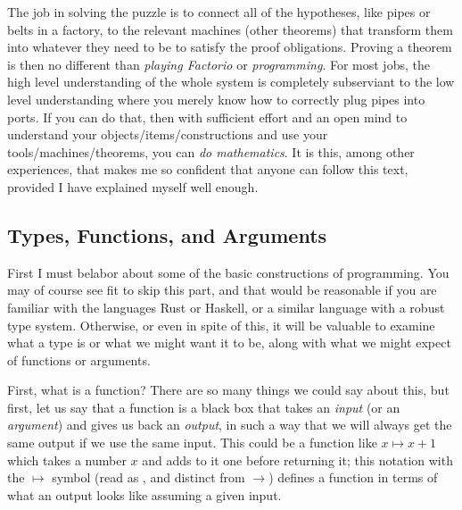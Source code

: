 \documentclass[11pt]{article}
\begin{document}
The job in solving the puzzle is to connect all of the hypotheses, like pipes or belts in a factory, to the relevant machines (other theorems) that transform them into whatever they need to be to satisfy the proof obligations. Proving a theorem is then no different than \emph{playing Factorio} or \emph{programming}. For most jobs, the high level understanding of the whole system is completely subserviant to the low level understanding where you merely know how to correctly plug pipes into ports. If you can do that, then with sufficient effort and an open mind to understand your objects/items/constructions and use your tools/machines/theorems, you can \emph{do mathematics}. It is this, among other experiences, that makes me so confident that anyone can follow this text, provided I have explained myself well enough.

\subsection{Types, Functions, and Arguments}

First I must belabor about some of the basic constructions of programming. You may of course see fit to skip this part, and that would be reasonable if you are familiar with the languages Rust or Haskell, or a similar language with a robust type system. Otherwise, or even in spite of this, it will be valuable to examine what a type is or what we might want it to be, along with what we might expect of functions or arguments.

First, what is a function? There are so many things we could say about this, but first, let us say that a function is a black box that takes an \emph{input} (or an \emph{argument}) and gives us back an \emph{output}, in such a way that we will always get the same output if we use the same input. This could be a function like $x \mapsto x + 1$ which takes a number $x$ and adds to it one before returning it; this notation with the $\mapsto$ symbol (read as , and distinct from $\to$) defines a function in terms of what an output looks like assuming a given input.
\end{document}
